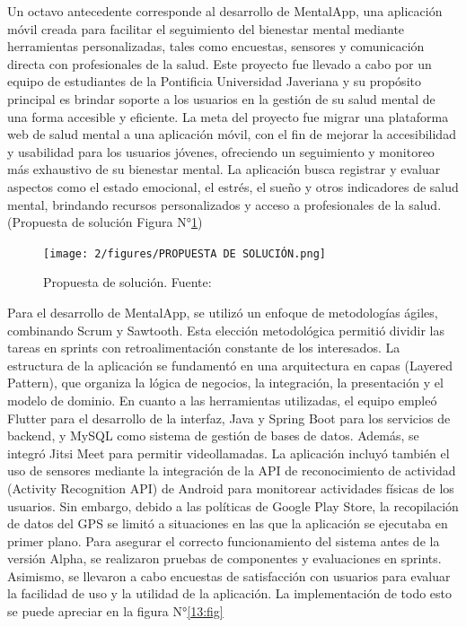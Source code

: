 Un octavo antecedente corresponde al desarrollo de MentalApp, una aplicación móvil creada para facilitar el seguimiento del bienestar mental mediante herramientas personalizadas, tales como encuestas, sensores y comunicación directa con profesionales de la salud. Este proyecto fue llevado a cabo por un equipo de estudiantes de la Pontificia Universidad Javeriana y su propósito principal es brindar soporte a los usuarios en la gestión de su salud mental de una forma accesible y eficiente. La meta del proyecto fue migrar una plataforma web de salud mental a una aplicación móvil, con el fin de mejorar la accesibilidad y usabilidad para los usuarios jóvenes, ofreciendo un seguimiento y monitoreo más exhaustivo de su bienestar mental. 
La aplicación busca registrar y evaluar aspectos como el estado emocional, el estrés, el sueño y otros indicadores de salud mental, brindando recursos personalizados y acceso a profesionales de la salud. (Propuesta de solución Figura N°\ref{12:fig})

\begin{figure}[ht]
	\centering
	\texttt{[image: 2/figures/PROPUESTA DE SOLUCIÓN.png]}
	\caption{Propuesta de solución. Fuente: \cite{coral2023}}
	\label{12:fig}
\end{figure}

Para el desarrollo de MentalApp, se utilizó un enfoque de metodologías ágiles, combinando Scrum y Sawtooth. Esta elección metodológica permitió dividir las tareas en sprints con retroalimentación constante de los interesados. La estructura de la aplicación se fundamentó en una arquitectura en capas (Layered Pattern), que organiza la lógica de negocios, la integración, la presentación y el modelo de dominio. En cuanto a las herramientas utilizadas, el equipo empleó Flutter para el desarrollo de la interfaz, Java y Spring Boot para los servicios de backend, y MySQL como sistema de gestión de bases de datos. Además, se integró Jitsi Meet para permitir videollamadas. La aplicación incluyó también el uso de sensores mediante la integración de la API de reconocimiento de actividad (Activity Recognition API) de Android para monitorear actividades físicas de los usuarios. Sin embargo, debido a las políticas de Google Play Store, la recopilación de datos del GPS se limitó a situaciones en las que la aplicación se ejecutaba en primer plano. Para asegurar el correcto funcionamiento del sistema antes de la versión Alpha, se realizaron pruebas de componentes y evaluaciones en sprints. Asimismo, se llevaron a cabo encuestas de satisfacción con usuarios para evaluar la facilidad de uso y la utilidad de la aplicación. La implementación de todo esto se puede apreciar en la figura N°\ref{13:fig}

